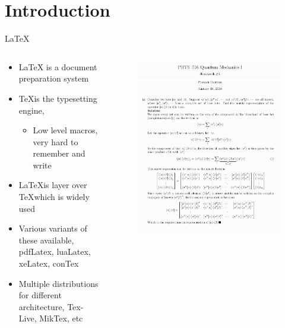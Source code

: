 \documentclass[aspectratio=169]{beamer}
\begin{document}
\section{Introduction}
%
\begin{frame}{\LaTeX}
    \begin{columns}
        \begin{column}{0.49\textwidth}
            \begin{itemize}
                \item \LaTeX %
                    is a document preparation system
                \item \TeX is the typesetting engine, 
                    \begin{itemize}
                        \item Low level macros, very hard to remember and write
                    \end{itemize}
                \item \LaTeX is layer over \TeX which is widely used
                \item Various variants of these available, pdfLatex, luaLatex, xeLatex, conTex
                \item Multiple distributions for different architecture, Tex-Live, MikTex, etc
            \end{itemize}
        \end{column}
        \begin{column}{0.49\textwidth}
            \begin{figure}[h!]
                \centering
                \includegraphics[width=0.8\linewidth]{images/QHW1_light.png}
            \end{figure}
        \end{column}
    \end{columns}
\end{frame} 
\end{document}
